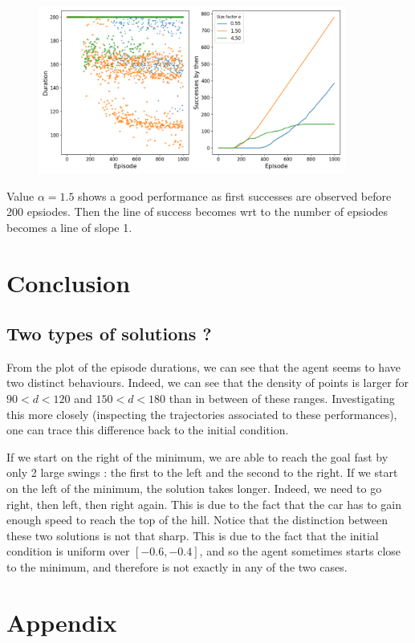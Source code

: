 \documentclass[a4paper, 12pt,oneside]{article}
\begin{document}
        \begin{figure}[h]
            \centering
            \includegraphics[width=0.9\textwidth]{../runs/dyna/dyna_comparison.png}
            \caption{}
            \label{dyna-first}
        \end{figure}
        
        Value $\alpha=1.5$ shows a good performance as first successes are observed before 200 epsiodes. Then the line of success becomes wrt to the number of epsiodes becomes a line of slope 1. 


        \section{Conclusion}
        \subsection{Two types of solutions ?}
        From the plot of the episode durations, we can see that the agent seems to have two distinct behaviours. Indeed, we can see that the density of points is larger for $90<d<120$ and $150<d<180$ than in between of these ranges. Investigating this more closely (inspecting the trajectories associated to these performances), one can trace this difference back to the initial condition. 
        
        If we start on the right of the minimum, we are able to reach the goal fast by only 2 large swings : the first to the left and the second to the right. If we start on the left of the minimum, the solution takes longer. Indeed, we need to go right, then left, then right again. This is due to the fact that the car has to gain enough speed to reach the top of the hill.
        Notice that the distinction between these two solutions is not that sharp. This is due to the fact that the initial condition is uniform over $[-0.6,-0.4]$, and so the agent sometimes starts close to the minimum, and therefore is not exactly in any of the two cases. 
        \section{Appendix}
\end{document}
